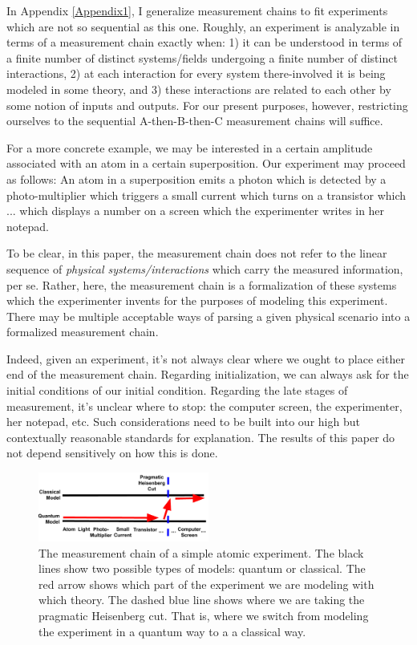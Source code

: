 \documentclass[12pt,prd,superscriptaddress,floatfix,amsmath,amssymb,amsfonts,nofootinbib]{revtex4-2}
\begin{document}
In Appendix \ref{Appendix1}, I generalize measurement chains to fit experiments which are not so sequential as this one. Roughly, an experiment is analyzable in terms of a measurement chain exactly when: 1) it can be understood in terms of a finite number of distinct systems/fields undergoing a finite number of distinct interactions, 2) at each interaction for every system there-involved it is being modeled in some theory, and 3) these interactions are related to each other by some notion of inputs and outputs. For our present purposes, however, restricting ourselves to the sequential A-then-B-then-C measurement chains will suffice.

For a more concrete example, we may be interested in a certain amplitude associated with an atom in a certain superposition. Our experiment may proceed as follows: An atom in a superposition emits a photon which is detected by a photo-multiplier which triggers a small current which turns on a transistor which ... which displays a number on a screen which the experimenter writes in her notepad.

To be clear, in this paper, the measurement chain does not refer to the linear sequence of \textit{physical systems/interactions} which carry the measured information, per se. Rather, here, the measurement chain is a formalization of these systems which the experimenter invents for the purposes of modeling this experiment. There may be multiple acceptable ways of parsing a given physical scenario into a formalized measurement chain. 

Indeed, given an experiment, it's not always clear where we ought to place either end of the measurement chain. Regarding initialization, we can always ask for the initial conditions of our initial condition. Regarding the late stages of measurement, it's unclear where to stop: the computer screen, the experimenter, her notepad, etc. Such considerations need to be built into our high but contextually reasonable standards for explanation. The results of this paper do not depend sensitively on how this is done.

\begin{figure}
\includegraphics[width=0.5\textwidth]{Figures/HeisenbergCut.pdf}
\caption{The measurement chain of a simple atomic experiment. The black lines show two possible types of models: quantum or classical. The red arrow shows which part of the experiment we are modeling with which theory. The dashed blue line shows where we are taking the pragmatic Heisenberg cut. That is, where we switch from modeling the experiment in a quantum way to a a classical way.}\label{FigHCut}
\end{figure}
\end{document}
